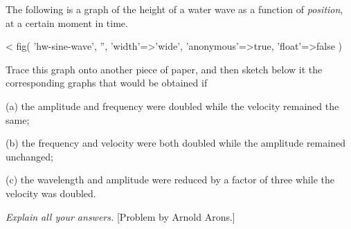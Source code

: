 The following is a graph of the height of a water wave as
a function of \emph{position}, at a certain moment in time.

<%
  fig(
    'hw-sine-wave',
    '',
    {
      'width'=>'wide',
      'anonymous'=>true,
      'float'=>false
    }
  )

Trace this graph onto another piece of paper, and then
sketch below it the corresponding graphs that would be obtained if

(a) the amplitude and frequency were doubled while the
velocity remained the same;

(b) the frequency and velocity were both doubled while the
amplitude remained unchanged;

(c) the wavelength and amplitude were reduced by a factor of
three while the velocity was doubled.

\emph{Explain all your answers.}
[Problem by Arnold Arons.]
